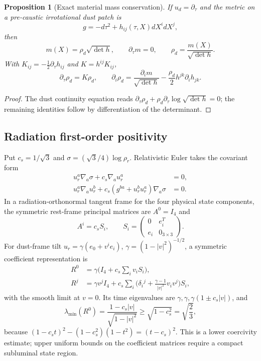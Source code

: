 \documentclass[11pt,a4paper]{article}
\newtheorem{proposition}[theorem]{Proposition}
\begin{document}
\begin{proposition}[Exact material mass conservation]\label{prop:mass}
If $u_d=\partial_\tau$ and the metric on a pre-caustic irrotational dust patch is
\[g=-d\tau^2+h_{ij}(\tau,X)dX^idX^j,\]
then
\[m(X)=\rho_d\sqrt{\det h},\qquad \partial_\tau m=0,
\qquad\rho_d=\frac{m(X)}{\sqrt{\det h}}.\]
With $K_{ij}=-\tfrac12\partial_\tau h_{ij}$ and $K=h^{ij}K_{ij}$,
\[\partial_\tau\rho_d=K\rho_d,\qquad
\partial_i\rho_d=\frac{\partial_i m}{\sqrt{\det h}}-\frac{\rho_d}{2}h^{jk}\partial_i h_{jk}.\]
\end{proposition}
\begin{proof}The dust continuity equation reads $\partial_\tau\rho_d+\rho_d\partial_\tau\log\sqrt{\det h}=0$; the remaining identities follow by differentiation of the determinant.\end{proof}

\subsection{Radiation first-order positivity}
Put $c_s=1/\sqrt3$ and $\sigma=(\sqrt3/4)\log\rho_r$. Relativistic Euler takes the covariant form
\begin{align}
u_r^a\nabla_a\sigma+c_s\nabla_a u_r^a&=0,\\
u_r^a\nabla_a u_r^b+c_s(g^{ba}+u_r^bu_r^a)\nabla_a\sigma&=0.\label{eq:euler}
\end{align}
In a radiation-orthonormal tangent frame for the four physical state components, the symmetric rest-frame principal matrices are $A^0=I_4$ and
\[A^i=c_sS_i,\qquad S_i=\begin{pmatrix}0&e_i^T\\e_i&0_{3\times3}\end{pmatrix}.\]
For dust-frame tilt $u_r=\gamma(e_0+v^ie_i)$, $\gamma=(1-|v|^2)^{-1/2}$, a symmetric coefficient representation is
\begin{align}
R^0&=\gamma\Big(I_4+c_s\sum_iv_iS_i\Big),\label{eq:R0}\\
R^j&=\gamma v^j I_4+c_s\sum_i\Big(\delta_i{}^j+\frac{\gamma-1}{|v|^2}v_i v^j\Big)S_i,\label{eq:Rj}
\end{align}
with the smooth limit at $v=0$. Its time eigenvalues are $\gamma,\gamma,\gamma(1\pm c_s|v|)$, and
\begin{equation}\lambda_{\min}(R^0)=\frac{1-c_s|v|}{\sqrt{1-|v|^2}}
\ge\sqrt{1-c_s^2}=\sqrt{\frac23},\label{eq:acousticbound}\end{equation}
because $(1-c_st)^2-(1-c_s^2)(1-t^2)=(t-c_s)^2$. This is a lower coercivity estimate; upper uniform bounds on the coefficient matrices require a compact subluminal state region.
\end{document}

